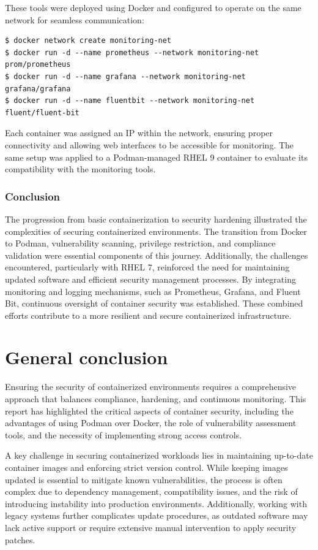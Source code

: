 \documentclass[12pt,a4paper]{report}
\begin{document}
These tools were deployed using Docker and configured to operate on the same network for seamless communication:

\begin{lstlisting}
$ docker network create monitoring-net
$ docker run -d --name prometheus --network monitoring-net prom/prometheus
$ docker run -d --name grafana --network monitoring-net grafana/grafana
$ docker run -d --name fluentbit --network monitoring-net fluent/fluent-bit
\end{lstlisting}

Each container was assigned an IP within the network, ensuring proper connectivity and allowing web interfaces to be accessible for monitoring. The same setup was applied to a Podman-managed RHEL 9 container to evaluate its compatibility with the monitoring tools.
\newpage
\subsection{Conclusion}
The progression from basic containerization to  security hardening illustrated the complexities of securing containerized environments. The transition from Docker to Podman, vulnerability scanning, privilege restriction, and compliance validation were essential components of this journey. Additionally, the challenges encountered, particularly with RHEL 7, reinforced the need for maintaining updated software and efficient security management processes. By integrating monitoring and logging mechanisms, such as Prometheus, Grafana, and Fluent Bit, continuous oversight of container security was established. These combined efforts contribute to a more resilient and secure containerized infrastructure.
\chapter*{General conclusion}
\thispagestyle{plain}
Ensuring the security of containerized environments requires a comprehensive approach that balances compliance, hardening, and continuous monitoring. This report has highlighted the critical aspects of container security, including the advantages of using Podman over Docker, the role of vulnerability assessment tools, and the necessity of implementing strong access controls.

A key challenge in securing containerized workloads lies in maintaining up-to-date container images and enforcing strict version control. While keeping images updated is essential to mitigate known vulnerabilities, the process is often complex due to dependency management, compatibility issues, and the risk of introducing instability into production environments. Additionally, working with legacy systems further complicates update procedures, as outdated software may lack active support or require extensive manual intervention to apply security patches.
\end{document}
